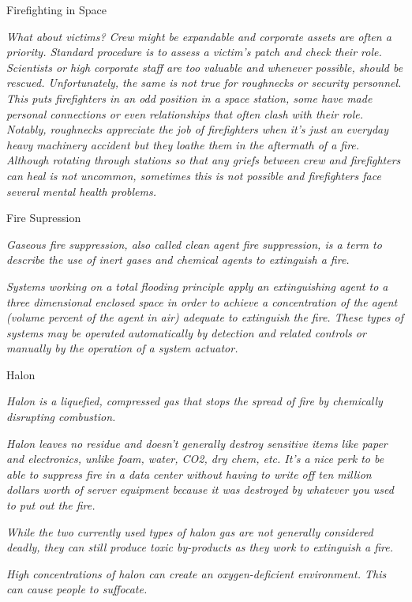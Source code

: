 \begin{rpg-commentbox}{Firefighting in Space}
\begin{small}
    \textit{What about victims? Crew might be expandable and corporate assets are often a priority. Standard procedure is to assess a victim's patch and check their role. Scientists or high corporate staff are too valuable and whenever possible, should be rescued. Unfortunately, the same is not true for roughnecks or security personnel. This puts firefighters in an odd position in a space station, some have made personal connections or even relationships that often clash with their role. Notably, roughnecks appreciate the job of  firefighters when it's just an everyday heavy machinery accident but they loathe them in the aftermath of a fire. Although rotating through stations so that any griefs between crew and firefighters can heal is not uncommon, sometimes this is not possible and firefighters face several mental health problems.}

\end{small}
\end{rpg-commentbox}


\newsect

\medskip


\medskip
\begin{rpg-commentbox}{Fire Supression}
\begin{small}
    \textit{Gaseous fire suppression, also called clean agent fire suppression, is a term to describe the use of inert gases and chemical agents to extinguish a fire.}    

    \textit{Systems working on a total flooding principle apply an extinguishing agent to a three dimensional enclosed space in order to achieve a concentration of the agent (volume percent of the agent in air) adequate to extinguish the fire. These types of systems may be operated automatically by detection and related controls or manually by the operation of a system actuator.}

\end{small}
\end{rpg-commentbox}

\newsect


\medskip
\begin{rpg-commentbox}{Halon}
\begin{small}
    \textit{Halon is a liquefied, compressed gas that stops the spread of fire by chemically disrupting combustion.}

    \textit{Halon leaves no residue and doesn't generally destroy sensitive items like paper and electronics, unlike foam, water, CO2, dry chem, etc. It's a nice perk to be able to suppress fire in a data center without having to write off ten million dollars worth of server equipment because it was destroyed by whatever you used to put out the fire.}

    \textit{While the two currently used types of halon gas are not generally considered deadly, they can still produce toxic by-products as they work to extinguish a fire.}

    \textit{High concentrations of halon can create an oxygen-deficient environment. This can cause people to suffocate.}
\end{small}
\end{rpg-commentbox}


